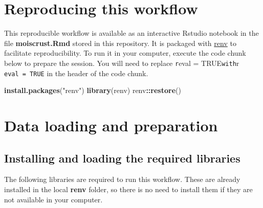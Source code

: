 \documentclass[]{article}
\newenvironment{Shaded}{\begin{snugshade}}{\end{snugshade}}
\newcommand{\KeywordTok}[1]{\textcolor[rgb]{0.13,0.29,0.53}{\textbf{#1}}}
\newcommand{\NormalTok}[1]{#1}
\newcommand{\OperatorTok}[1]{\textcolor[rgb]{0.81,0.36,0.00}{\textbf{#1}}}
\newcommand{\StringTok}[1]{\textcolor[rgb]{0.31,0.60,0.02}{#1}}
\begin{document}
\hypertarget{reproducing-this-workflow}{%
\section{Reproducing this workflow}\label{reproducing-this-workflow}}

This reproducible workflow is available as an interactive Rstudio
notebook in the file \textbf{moiscrust.Rmd} stored in this repository.
It is packaged with \href{https://cran.r-project.org/package=renv}{renv}
to facilitate reproducibility. To run it in your computer, execute the
code chunk below to prepare the session. You will need to replace
\texttt{r}eval = TRUE\texttt{with}r \texttt{eval\ =\ TRUE} in the header
of the code chunk.

\begin{Shaded}
\begin{Highlighting}[]
\KeywordTok{install.packages}\NormalTok{(}\StringTok{"renv"}\NormalTok{)}
\KeywordTok{library}\NormalTok{(renv)}
\NormalTok{renv}\OperatorTok{::}\KeywordTok{restore}\NormalTok{()}
\end{Highlighting}
\end{Shaded}

\hypertarget{data-loading-and-preparation}{%
\section{Data loading and
preparation}\label{data-loading-and-preparation}}

\hypertarget{installing-and-loading-the-required-libraries}{%
\subsection{Installing and loading the required
libraries}\label{installing-and-loading-the-required-libraries}}

The following libraries are required to run this workflow. These are
already installed in the local \textbf{renv} folder, so there is no need
to install them if they are not available in your computer.
\end{document}
